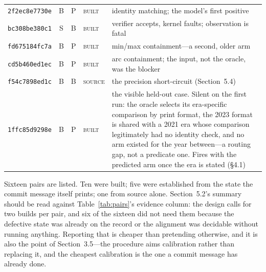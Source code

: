 \begin{table}[h]
\begin{tabular}{@{}l@{\hspace{4pt}}c@{\hspace{4pt}}c@{\hspace{4pt}}l@{\hspace{4pt}}p{}@{}}
\texttt{2f2ec8e7730e} & B & P & \textsc{built} & identity matching; the model's first positive \\
\texttt{bc308be380c1} & S & B & \textsc{built} & verifier accepts, kernel faults; observation is fatal \\
\texttt{fd675184fc7a} & B & P & \textsc{built} & min/max containment---a second, older arm \\
\texttt{cd5b460ed1ec} & B & P & \textsc{built} & arc containment; the input, not the oracle, was the blocker \\
\texttt{f54c7898ed1c} & B & B & \textsc{source} & the precision short-circuit (Section~5.4) \\
\texttt{1ffc85d9298e} & B & P & \textsc{built} & the visible held-out case. Silent on the first run: the oracle selects its era-specific comparison by print format, the 2023 format is shared with a 2021 era whose comparison legitimately had no identity check, and no arm existed for the year between---a routing gap, not a predicate one. Fires with the predicted arm once the era is stated (\S4.1) \\
\bottomrule
\end{tabular}
\end{table}

\noindent Sixteen pairs are listed. Ten were built; five were established from the
state the commit message itself prints; one from source alone. Section~5.2's summary
should be read against Table~\ref{tab:pairs}'s evidence column: the design calls for
two builds per pair, and six of the sixteen did not need them because the defective
state was already on the
record or the alignment was decidable without running anything. Reporting that is
cheaper than pretending otherwise, and it is also the point of Section~3.5---the
procedure aims calibration rather than replacing it, and the cheapest calibration is
the one a commit message has already done.
